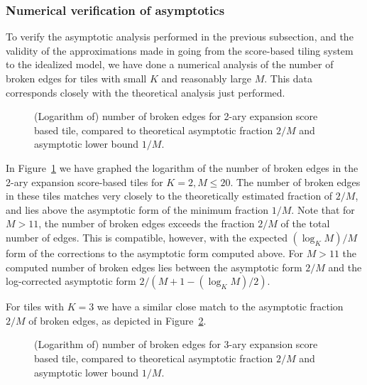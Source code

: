 \documentclass[12pt]{article}
\begin{document}
\subsubsection{Numerical verification of asymptotics}
\label{sec:numerical-asymptotics}

To verify the asymptotic analysis performed in the previous
subsection, and the validity of the approximations made in going from
the score-based tiling system to the idealized model, we have done a
numerical analysis of the number of broken edges for tiles with small
$K$ and reasonably large $M$.  This data corresponds closely with the
theoretical analysis just performed.

\begin{figure}
\begin{center}
\end{center}
\caption[x]{\footnotesize (Logarithm of) number of broken edges for
  2-ary expansion score based tile, compared to theoretical asymptotic
  fraction $2/M$ and asymptotic lower bound $1/M$.}
\label{f:numbers-2}
\end{figure}

In Figure~\ref{f:numbers-2} we have graphed the logarithm of the
number of broken edges in the 2-ary expansion score-based tiles for $K
= 2, M \leq 20$.  The number of broken edges in these tiles matches
very closely to the theoretically estimated fraction of $2/M$, and
lies above the asymptotic form of the minimum fraction $1/M$.
Note that for $M > 11$, the number of broken edges exceeds the
fraction $2/M$ of the total number of edges.  This is compatible, however, with the expected 
$(\log_K M)/M$ 
form of the corrections to the asymptotic form computed above.  
For $M > 11$ the computed number of broken edges lies between the
asymptotic form $2/M$ and the log-corrected asymptotic form
$2/(M + 1-(\log_K M)/2)$.

For tiles with $K = 3$ we have a similar close match to the asymptotic
fraction $2/M$ of broken edges, as depicted in Figure~\ref{f:numbers-3}.
\begin{figure}
\begin{center}
\end{center}
\caption[x]{\footnotesize (Logarithm of) number of broken edges for
  3-ary expansion score based tile, compared to theoretical asymptotic
  fraction $2/M$ and asymptotic lower bound $1/M$.}
\label{f:numbers-3}
\end{figure}
\end{document}

